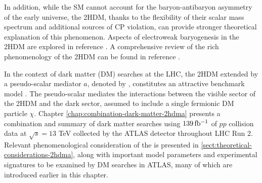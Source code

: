 In addition, while the SM cannot account for the baryon-antibaryon asymmetry of the early universe, the 2HDM, thanks to the flexibility of their scalar mass spectrum and additional sources of CP violation, can provide stronger theoretical explanation of this phenomenon. 
Aspects of electroweak baryogenesis in the 2HDM are explored in reference \cite{Joyce_1996, Funakubo_1994, Cline_1996, PhysRevD.55.3873, LAINE200123, LarsFromme_2006}. 
A comprehensive review of the rich phenomenology of the 2HDM can be found in reference \cite{Branco_2012}.

In the context of dark matter (DM) searches at the LHC, the 2HDM extended by a pseudo-scalar mediator $a$, denoted by \thdma, constitutes an attractive benchmark model \cite{2HDMWGproxi}. The pseudo-scalar mediates the interactions between the visible sector of the 2HDM and the dark sector, assumed to include a single fermionic DM particle $\chi$. Chapter \ref{chap:combination-dark-matter-2hdma} presents a combination and summary of dark matter searches using $139\, \mbox{fb\(^{-1}\)}$ of $pp$ collision data at $\sqrt{s}=13$ TeV collected by the ATLAS detector throughout LHC Run 2. 
Relevant phenomenological consideration of the \thdma is presented in \ref{sect:theoretical-considerations-2hdma}, along with important model parameters and experimental signatures to be examined by DM searches in ATLAS, many of which are introduced earlier in this chapter. 